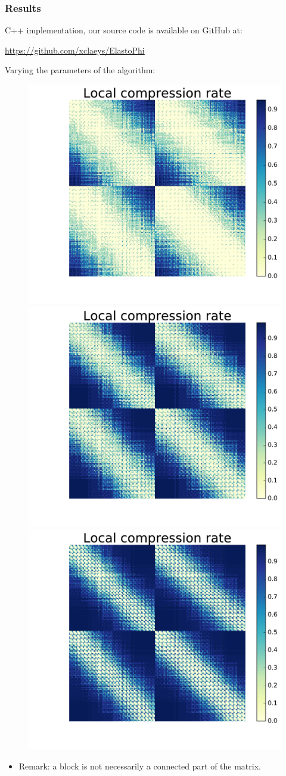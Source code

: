 
\begin{frame}
\frametitle{Results}

C++ implementation, our source code is available on GitHub at:
\begin{center}
\url{https://github.com/xclaeys/ElastoPhi}
\end{center}

Varying the parameters of the algorithm:
\vspace{-5pt}
\begin{figure}
\centering
\includegraphics[width=.33\textwidth]{../images/graphe_mapp_output_local_comp_1_0,9_matrice450Fracs.pdf}
\includegraphics[width=.33\textwidth]{../images/graphe_mapp_output_local_comp_10_0,9_matrice450Fracs.pdf}
\includegraphics[width=.33\textwidth]{../images/graphe_mapp_output_local_comp_10_1_matrice450Fracs.pdf}
\end{figure}
\begin{itemize}
\item Remark: a block is not necessarily a connected part of the matrix.
\end{itemize}
\end{frame}


